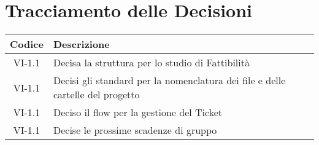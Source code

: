 \section*{Tracciamento delle Decisioni}

\begin{center}
	\begin{longtable}{|c|p{14.5cm}|}
	\hline
	\rowcolor{lighter-grayer}
	\textbf{Codice} & \textbf{Descrizione} \\
	\hline
	\endfirsthead
	\hline
	VI-1.1 & Decisa la struttura per lo studio di Fattibilità \\
	VI-1.1 & Decisi gli standard per la nomenclatura dei file e delle cartelle del progetto \\
	VI-1.1 & Deciso il flow per la gestione del Ticket \\
	VI-1.1 & Decise le prossime scadenze di gruppo \\
	\hline

	\end{longtable}
\end{center}
